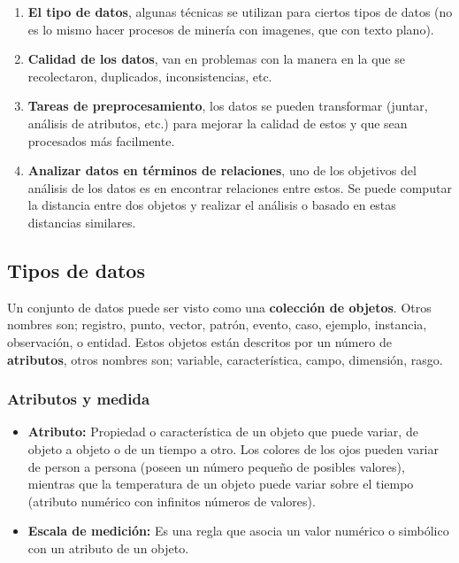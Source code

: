 \documentclass{article}
\begin{document}
\begin{enumerate}
  \item \textbf{El tipo de datos}, algunas técnicas se utilizan para ciertos tipos de datos (no es lo mismo hacer procesos de minería con imagenes, que con texto plano).
  \item \textbf{Calidad de los datos}, van en problemas con la manera en la que se recolectaron, duplicados, inconsistencias, etc.
  \item \textbf{Tareas de preprocesamiento}, los datos se pueden transformar (juntar, análisis de atributos, etc.) para mejorar la calidad de estos y que sean procesados más facilmente.
  \item \textbf{Analizar datos en términos de relaciones}, uno de los objetivos del análisis de los datos es en encontrar relaciones entre estos. Se puede computar la distancia entre dos objetos y realizar el análisis o basado en estas distancias similares.
\end{enumerate}

\subsection{Tipos de datos}

Un conjunto de datos puede ser visto como una \textbf{colección de objetos}. Otros nombres son; registro, punto, vector, patrón, evento, caso, ejemplo, instancia, observación, o entidad. Estos objetos están descritos por un número de \textbf{atributos}, otros nombres son; variable, característica, campo, dimensión, rasgo.

\subsubsection{Atributos y medida}

\begin{itemize}
  \item \textbf{Atributo:} Propiedad o característica de un objeto que puede variar, de objeto a objeto o de un tiempo a otro. Los colores de los ojos pueden variar de person a persona (poseen un número pequeño de posibles valores), mientras que la temperatura de un objeto puede variar sobre el tiempo (atributo numérico con infinitos números de valores).
  \item \textbf{Escala de medición:} Es una regla que asocia un valor numérico o simbólico con un atributo de un objeto.
\end{itemize}
\end{document}
